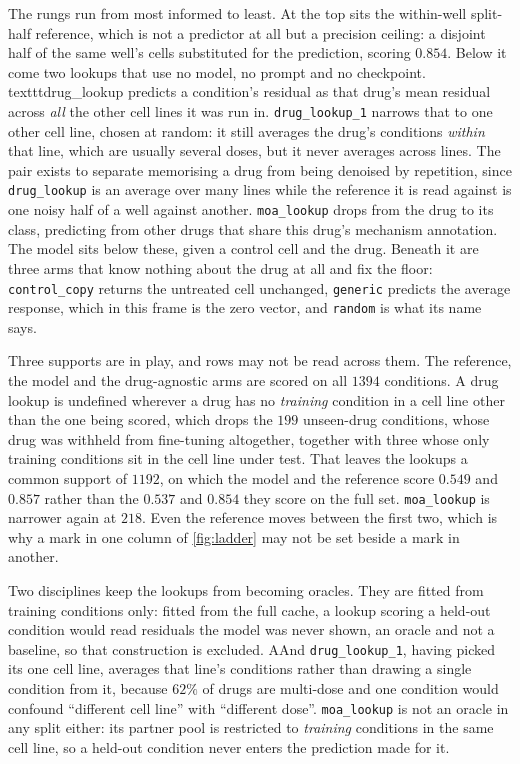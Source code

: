 The rungs run from most informed to least. At the top sits the within-well
split-half reference, which is not a predictor at all but a precision ceiling: a
disjoint half of the same well's cells substituted for the prediction, scoring
$0.854$. Below it come two lookups that use no model, no prompt and no checkpoint.
\\texttt{drug\_lookup} predicts a condition's residual as that drug's mean residual
across \emph{all} the other cell lines it was run in. \texttt{drug\_lookup\_1}
narrows that to one other cell line, chosen at random: it still averages the
drug's conditions \emph{within} that line, which are usually several doses, but it
never averages across lines. The pair exists to separate memorising a drug from
being denoised by repetition, since \texttt{drug\_lookup} is an average over many
lines while the reference it is read against is one noisy half of a well against
another. \texttt{moa\_lookup} drops
from the drug to its class, predicting from other drugs that share this drug's
mechanism annotation. The model sits below these, given a control cell and the
drug. Beneath it are three arms that know nothing about the drug at all and fix
the floor: \texttt{control\_copy} returns the untreated cell unchanged,
\texttt{generic} predicts the average response, which in this frame is the zero
vector, and \texttt{random} is what its name says.

Three supports are in play, and rows may not be read across them. The reference,
the model and the drug-agnostic arms are scored on all $\num{1394}$ conditions.
A drug lookup is undefined wherever a drug has no
\emph{training} condition in a cell line other than the one being scored, which
drops the $\num{199}$ unseen-drug conditions, whose drug was withheld from
fine-tuning altogether, together with three whose only training conditions sit in
the cell line under test. That leaves the lookups a common support of
$\num{1192}$, on which the model and the reference score $0.549$ and $0.857$
rather than the $0.537$ and $0.854$ they score on the full set.
\texttt{moa\_lookup} is narrower again at $\num{218}$. Even
the reference moves between the first two, which is why a mark in one column of
\cref{fig:ladder} may not be set beside a mark in another.

Two disciplines keep the lookups from becoming oracles. They are fitted from
training conditions only: fitted from the full cache, a lookup scoring a held-out
condition would read residuals the model was never shown, an oracle and not a
baseline, so that construction is excluded. AAnd \texttt{drug\_lookup\_1}, having
picked its one cell line, averages that line's conditions rather than drawing a
single condition from it, because $62\%$ of drugs are multi-dose and one condition
would confound ``different cell line'' with ``different dose''. \texttt{moa\_lookup} is not an oracle in any split either: its
partner pool is restricted to \emph{training} conditions in the same cell line, so
a held-out condition never enters the prediction made for it.

